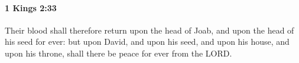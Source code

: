 
		\paragraph{1 Kings 2:33} %
			\label{1KINGS-2-33}

			Their blood shall therefore return upon the head of Joab, and upon the head of his seed for ever: but upon David, and upon his seed, and upon his house, and upon his throne, shall there be peace for ever from the LORD.


